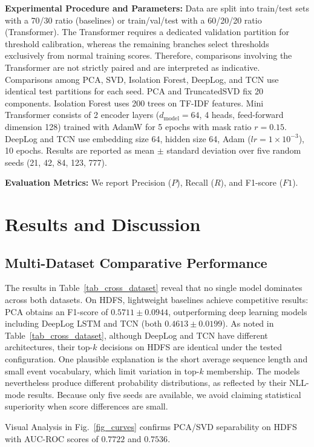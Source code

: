 \documentclass[conference]{IEEEtran}
\begin{document}
\textbf{Experimental Procedure and Parameters:} Data are split into train/test sets with a 70/30 ratio (baselines) or train/val/test with a 60/20/20 ratio (Transformer). The Transformer requires a dedicated validation partition for threshold calibration, whereas the remaining branches select thresholds exclusively from normal training scores. Therefore, comparisons involving the Transformer are not strictly paired and are interpreted as indicative. Comparisons among PCA, SVD, Isolation Forest, DeepLog, and TCN use identical test partitions for each seed.
PCA and TruncatedSVD fix 20 components. Isolation Forest uses 200 trees on TF-IDF features. Mini Transformer consists of 2 encoder layers ($d_{\text{model}}{=}64$, 4 heads, feed-forward dimension 128) trained with AdamW \cite{b17} for 5 epochs with mask ratio $r{=}0.15$. DeepLog and TCN use embedding size 64, hidden size 64, Adam ($lr{=}1\times 10^{-3}$), 10 epochs. Results are reported as mean $\pm$ standard deviation over five random seeds (21, 42, 84, 123, 777).

\textbf{Evaluation Metrics:} We report Precision ($P$), Recall ($R$), and F1-score ($F1$).

\section{Results and Discussion}
\subsection{Multi-Dataset Comparative Performance}

The results in Table~\ref{tab_cross_dataset} reveal that no single model dominates across both datasets. On HDFS, lightweight baselines achieve competitive results: PCA obtains an F1-score of $0.5711 \pm 0.0944$, outperforming deep learning models including DeepLog LSTM and TCN (both $0.4613 \pm 0.0199$). As noted in Table~\ref{tab_cross_dataset}, although DeepLog and TCN have different architectures, their top-$k$ decisions on HDFS are identical under the tested configuration. One plausible explanation is the short average sequence length and small event vocabulary, which limit variation in top-$k$ membership. The models nevertheless produce different probability distributions, as reflected by their NLL-mode results. Because only five seeds are available, we avoid claiming statistical superiority when score differences are small.

Visual Analysis in Fig.~\ref{fig_curves} confirms PCA/SVD separability on HDFS with AUC-ROC scores of $0.7722$ and $0.7536$.
\end{document}
